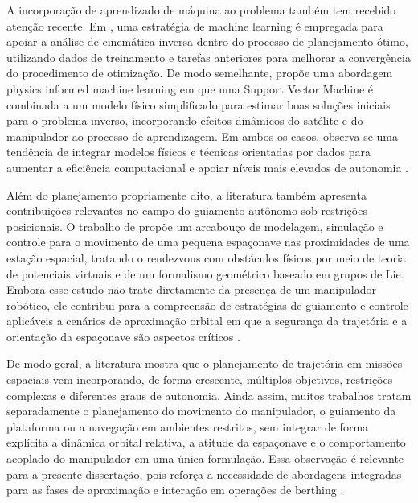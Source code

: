 A incorporação de aprendizado de máquina ao problema também tem recebido atenção recente. Em \cite{santos2022machine}, uma estratégia de machine learning é empregada para apoiar a análise de cinemática inversa dentro do processo de planejamento ótimo, utilizando dados de treinamento e tarefas anteriores para melhorar a convergência do procedimento de otimização. De modo semelhante, \cite{santos2023physics} propõe uma abordagem physics informed machine learning em que uma Support Vector Machine é combinada a um modelo físico simplificado para estimar boas soluções iniciais para o problema inverso, incorporando efeitos dinâmicos do satélite e do manipulador ao processo de aprendizagem. Em ambos os casos, observa-se uma tendência de integrar modelos físicos e técnicas orientadas por dados para aumentar a eficiência computacional e apoiar níveis mais elevados de autonomia \cite{santos2022machine,santos2023physics}.

Além do planejamento propriamente dito, a literatura também apresenta contribuições relevantes no campo do guiamento autônomo sob restrições posicionais. O trabalho de \cite{fiori2024modeling} propõe um arcabouço de modelagem, simulação e controle para o movimento de uma pequena espaçonave nas proximidades de uma estação espacial, tratando o rendezvous com obstáculos físicos por meio de teoria de potenciais virtuais e de um formalismo geométrico baseado em grupos de Lie. Embora esse estudo não trate diretamente da presença de um manipulador robótico, ele contribui para a compreensão de estratégias de guiamento e controle aplicáveis a cenários de aproximação orbital em que a segurança da trajetória e a orientação da espaçonave são aspectos críticos \cite{fiori2024modeling}.

De modo geral, a literatura mostra que o planejamento de trajetória em missões espaciais vem incorporando, de forma crescente, múltiplos objetivos, restrições complexas e diferentes graus de autonomia. Ainda assim, muitos trabalhos tratam separadamente o planejamento do movimento do manipulador, o guiamento da plataforma ou a navegação em ambientes restritos, sem integrar de forma explícita a dinâmica orbital relativa, a atitude da espaçonave e o comportamento acoplado do manipulador em uma única formulação. Essa observação é relevante para a presente dissertação, pois reforça a necessidade de abordagens integradas para as fases de aproximação e interação em operações de berthing \cite{santos2022machine,capolupo2017heuristic,fiori2024modeling,santos2023physics}.